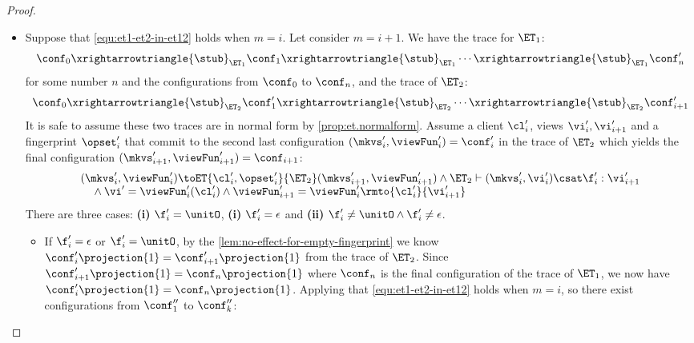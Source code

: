\begin{proof}
\begin{itemize}
\item {}
Suppose that \cref{equ:et1-et2-in-et12} holds when \( m = i \).
Let consider \( m = i + 1 \).
We have the trace for \( \ET_1 \):
\begin{equation}
    \conf_0 \xrightarrowtriangle{\stub}_{\ET_{1}} \conf_1 \xrightarrowtriangle{\stub}_{\ET_{1}} \cdots \xrightarrowtriangle{\stub}_{\ET_{1}} \conf'_{n} 
\end{equation}
for some number \( n \) and the configurations from \(\conf_0\) to \( \conf_n \), and the trace of \(\ET_2\):
\begin{equation}
    \conf_0 \xrightarrowtriangle{\stub}_{\ET_{2}} \conf'_1 \xrightarrowtriangle{\stub}_{\ET_{2}} \cdots \xrightarrowtriangle{\stub}_{\ET_{2}} \conf'_{i+1} 
\end{equation}
It is safe to assume these two traces are in normal form by \cref{prop:et.normalform}.
Assume a client \( \cl'_{i} \), views \( \vi'_{i}, \vi'_{i+1} \) and a fingerprint \( \opset'_{i} \) that commit to the second last configuration \( (\mkvs'_i, \viewFun'_i) = \conf'_i \) in the trace of \( \ET_2 \) which yields the final configuration \( (\mkvs'_{i+1}, \viewFun'_{i+1}) = \conf_{i+1} \):
\begin{equation}
    \label{equ:last-et-2}
    \begin{array}{@{}l @{}}
    (\mkvs'_i, \viewFun'_i) \toET{\cl'_{i}, \opset'_{i}}{\ET_2} (\mkvs'_{i+1}, \viewFun'_{i+1}) \land \ET_2 \vdash (\mkvs'_i, \vi'_i) \csat \f'_i  : \vi'_{i+1} \\
    \quad {} \land \vi' = \viewFun'_i(\cl'_i) \land \viewFun'_{i+1} = \viewFun'_i\rmto{\cl'_i}{\vi'_{i+1}}
    \end{array}
\end{equation}
There are three cases: \textbf{(i)} \( \f'_i = \unitO \), \textbf{(i)} \( \f'_i = \epsilon \) and \textbf{(ii)} \( \f'_i \neq \unitO \land \f'_i \neq \epsilon \).
\begin{itemize}
    \item If \( \f'_i = \epsilon \) or \( \f'_i = \unitO \), by the \cref{lem:no-effect-for-empty-fingerprint} we know \( \conf'_{i}\projection{1} = \conf'_{i+1}\projection{1}\) from the trace of \( \ET_2 \).
Since \( \conf'_{i+1}\projection{1} = \conf_n\projection{1}\) where \( \conf_n \) is the final configuration of the trace of \( \ET_1 \), we now have \( \conf'_{i}\projection{1} = \conf_n\projection{1}\).
Applying \ih that \cref{equ:et1-et2-in-et12} holds when \( m = i \), so there exist configurations from \( \conf''_1 \) to \( \conf''_k \):

\end{itemize}
\end{itemize}
\end{proof}
